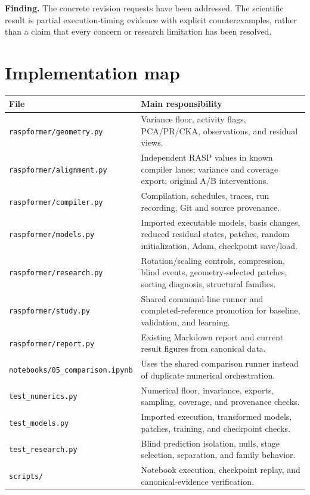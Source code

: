 \documentclass[10pt,a4paper]{article}
\newcommand{\newsection}[1]{\clearpage\section{#1}}
\newcommand{\finding}[1]{\par\begingroup\color{teal}\textbf{Finding.} #1\par\endgroup}
\begin{document}
\finding{The concrete revision requests have been addressed. The scientific result is partial execution-timing evidence with explicit counterexamples, rather than a claim that every concern or research limitation has been resolved.}

\appendix
\newsection{Implementation map}
\begingroup\small
\begin{tabularx}{\linewidth}{@{}P{.33\linewidth}X@{}}
\toprule
File & Main responsibility\\
\midrule
\nolinkurl{raspformer/geometry.py} & Variance floor, activity flags, PCA/PR/CKA, observations, and residual views.\\
\nolinkurl{raspformer/alignment.py} & Independent RASP values in known compiler lanes; variance and coverage export; original A/B interventions.\\
\nolinkurl{raspformer/compiler.py} & Compilation, schedules, traces, run recording, Git and source provenance.\\
\nolinkurl{raspformer/models.py} & Imported executable models, basis changes, reduced residual states, patches, random initialization, Adam, checkpoint save/load.\\
\nolinkurl{raspformer/research.py} & Rotation/scaling controls, compression, blind events, geometry-selected patches, sorting diagnosis, structural families.\\
\nolinkurl{raspformer/study.py} & Shared command-line runner and completed-reference promotion for baseline, validation, and learning.\\
\nolinkurl{raspformer/report.py} & Existing Markdown report and current result figures from canonical data.\\
\nolinkurl{notebooks/05_comparison.ipynb} & Uses the shared comparison runner instead of duplicate numerical orchestration.\\
\nolinkurl{test_numerics.py} & Numerical floor, invariance, exports, sampling, coverage, and provenance checks.\\
\nolinkurl{test_models.py} & Imported execution, transformed models, patches, training, and checkpoint checks.\\
\nolinkurl{test_research.py} & Blind prediction isolation, nulls, stage selection, separation, and family behavior.\\
\nolinkurl{scripts/} & Notebook execution, checkpoint replay, and canonical-evidence verification.\\
\bottomrule
\end{tabularx}
\endgroup
\end{document}
